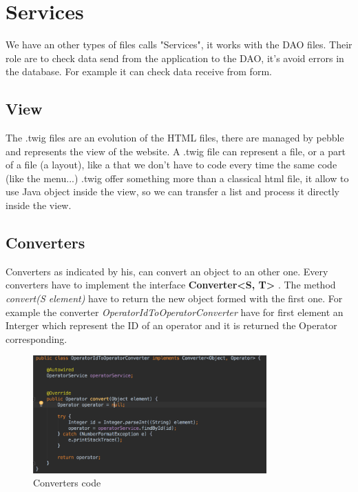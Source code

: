 \section{Services}

We have an other types of files calls "Services", it works with the DAO files.
Their role are to check data send from the application to the DAO, it's avoid errors in the database.
For example it can check data receive from form.


\subsection{View}

The .twig files are an evolution of the HTML files, there are managed by pebble and represents the view of the website.
A .twig file can represent a file, or a part of a file (a layout), like a that we don't have to code every time the same code (like the menu...)
.twig offer something more than a classical html file, it allow to use Java object inside the view, so we can transfer a list and process it directly inside the view.


\subsection{Converters}

Converters as indicated by his, can convert an object to an other one. Every converters have to implement the interface  \textbf{Converter<S, T>} . The method \textit{convert(S element)} have to return the new object formed with the first one. For example the converter \textit{OperatorIdToOperatorConverter} have for first element an Interger which represent the ID of an operator and it is returned the Operator corresponding. 

\begin{figure}[H]
  \caption{Converters code}
  \centering
    \includegraphics[width=0.8\textwidth]{img/converter.png}
\end{figure}



